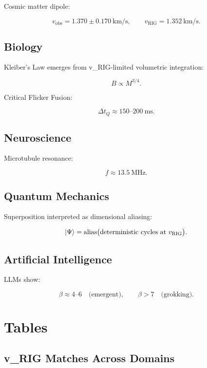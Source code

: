 \documentclass[11pt,a4paper]{article}
\begin{document}
Cosmic matter dipole:


\[
v_{\text{obs}} = 1.370 \pm 0.170~\text{km/s}, \qquad
v_{\text{RIG}} = 1.352~\text{km/s}.
\]



\subsection{Biology}

Kleiber's Law emerges from v\_RIG-limited volumetric integration:


\[
B \propto M^{3/4}.
\]



Critical Flicker Fusion:


\[
\Delta t_Q \approx 150\text{--}200~\text{ms}.
\]



\subsection{Neuroscience}

Microtubule resonance:


\[
f \approx 13.5~\text{MHz}.
\]



\subsection{Quantum Mechanics}

Superposition interpreted as dimensional aliasing:


\[
\ket{\Psi} = \text{alias}\big(\text{deterministic cycles at } v_{\text{RIG}}\big).
\]



\subsection{Artificial Intelligence}

LLMs show:


\[
\beta \approx 4\text{--}6 \quad \text{(emergent)}, \qquad
\beta > 7 \quad \text{(grokking)}.
\]



\section{Tables}

\subsection{v\_RIG Matches Across Domains}
\end{document}
